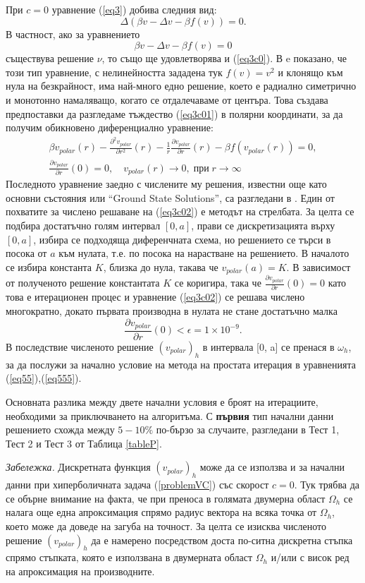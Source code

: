 \documentclass[a4paper]{article}
\newcommand{\be}{\begin{equation}}
\newcommand{\ee}{\end{equation}}
\newcommand{\rf}[1]{(\ref{#1})}
\theoremstyle{remark}
\begin{document}
\begin{large}
При $c=0$ уравнение \rf{eq3} добива следния вид:
\be\label{eq3c0}
\Delta (\beta  v - \Delta v - \beta f(v)) = 0.
\ee
В частност, ако за уравнението 
\be\label{eq3c01}
\beta v - \Delta v - \beta f(v) = 0
\ee
съществува решение $\nu$, то също ще удовлетворява и \rf{eq3c0}.  В \cite{ref1c00} e показано, че този тип уравнение, с нелинейността зададена тук $f(v) = v^2$ и клонящо към нула на безкрайност, има най-много едно решение, което е радиално симетрично и монотонно намаляващо, когато се отдалечаваме от центъра. Това създава предпоставки да разгледаме тъждество \rf{eq3c01} в полярни координати, за да получим обикновено диференциално уравнение:
\begin{align}\label{eq3c02}
\beta v_{polar}(r)  - \frac{ \partial^2 v_{polar} } {\partial r^2}(r) - \frac{1}{r} \frac{ \partial v_{polar} } {\partial r}(r)  - \beta f(v_{polar}(r)) = 0, \nonumber \\
\frac{ \partial v_{polar} } {\partial r}(0) = 0, \quad v_{polar}(r) \rightarrow 0, \; \text{при} \; r \rightarrow \infty
\end{align}
Последното уравнение заедно с числените му решения, известни още като основни състояния или ``Ground State Solutions'', са разгледани в \cite{ref1c0, ref2c0}. Един от похватите за числено решаване на \rf{eq3c02} е методът на стрелбата. За целта се подбира достатъчно голям интервал $[0, a]$, прави се дискретизацията върху $[0, a]$, избира се подходяща диференчната схема, но решението се търси в посока от $a$ към нулата, т.е. по посока на нарастване на решението. В началото се избира константа $K$, близка до нула, такава че $v_{polar}(a) = K$. В зависимост от полученото решение константата $K$ се коригира, така че $\frac{ \partial v_{polar} } {\partial r}(0) = 0$ като това е итерационен процес и уравнение \rf{eq3c02} се решава числено многократно, докато първата производна в нулата не стане достатъчно малка $$\frac{ \partial v_{polar} } {\partial r}(0) < \epsilon = 1\times10^{-9}.$$ В последствие численото решение $(v_{polar})_h$ в интервала [0, a] се пренася в $\omega_h$, за да послужи за начално условие на метода на простата итерация в уравненията \rf{eq55},\rf{eq555}.

Основната разлика между двете начални условия е броят на итерациите, необходими за приключването на алгоритъма. С \textbf{първия} тип начални данни решението схожда между $5-10\%$ по-бързо за случаите, разгледани в Тест 1, Тест 2 и Тест 3 от Таблица \ref{tableP}.

{\it Забележка.}
Дискретната функция $(v_{polar})_h$ може да се използва и за начални данни при хиперболичната задача \rf{problemVC} със скорост $c=0$. Тук трябва да се обърне внимание на факта, че при преноса в голямата двумерна област $\Omega_h$ се налага още една апроксимация спрямо радиус вектора на всяка точка от $\Omega_h$, което може да доведе на загуба на точност. За целта се изисква численото решение $(v_{polar})_h$ да е намерено посредством доста по-ситна дискретна стъпка спрямо стъпката, която е използвана в двумерната област $\Omega_h$ и/или с висок ред на апроксимация на производните.


\end{large}
\end{document}
